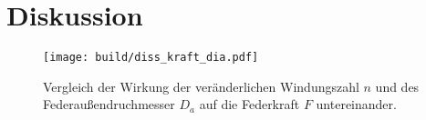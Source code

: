\newpage
\section{Diskussion}

\begin{figure}
    \center
    \texttt{[image: build/diss\_kraft\_dia.pdf]}
    \caption{
        Vergleich der Wirkung der veränderlichen Windungszahl $n$ und
        des Federaußendruchmesser $D_a$ auf die Federkraft $F$ untereinander.
    }
\end{figure}
\label{sec:Diskussion}
